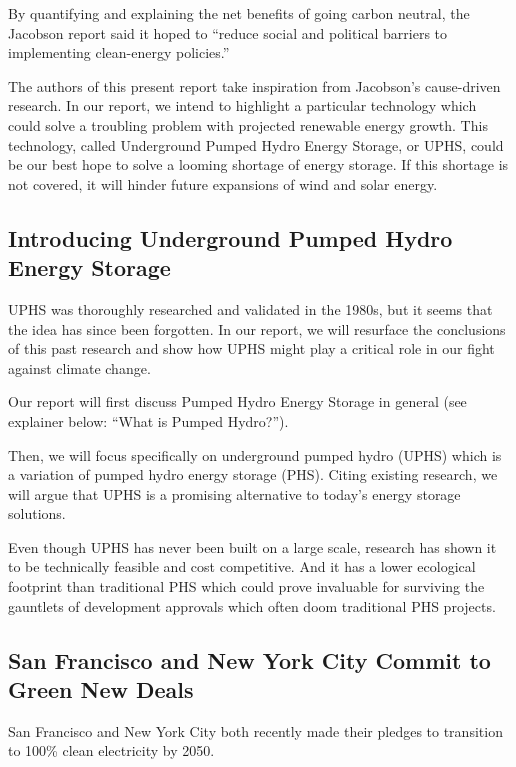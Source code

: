 \documentclass[hidelinks,12pt,a4paper]{article}
\begin{document}
By quantifying and explaining the net benefits of going carbon neutral, the Jacobson report said it hoped to “reduce social and political barriers to implementing clean-energy policies.” \cite{100PercCleanAndRenewableEnergyBy2050}

The authors of this present report take inspiration from Jacobson's cause-driven research. In our report, we intend to highlight a particular technology which could solve a troubling problem with projected renewable energy growth. This technology, called Underground Pumped Hydro Energy Storage, or UPHS, could be our best hope to solve a looming shortage of energy storage. If this shortage is not covered, it will hinder future expansions of wind and solar energy.

\subsection{Introducing Underground Pumped Hydro Energy Storage}
UPHS was thoroughly researched and validated in the 1980s, but it seems that the idea has since been forgotten. In our report, we will resurface the conclusions of this past research and show how UPHS might play a critical role in our fight against climate change.

Our report will first discuss Pumped Hydro Energy Storage in general (see explainer below: “What is Pumped Hydro?”).

Then, we will focus specifically on underground pumped hydro (UPHS) which is a variation of pumped hydro energy storage (PHS). Citing existing research, we will argue that UPHS is a promising alternative to today's energy storage solutions.

Even though UPHS has never been built on a large scale, research has shown it to be technically feasible and cost competitive. And it has a lower ecological footprint than traditional PHS which could prove invaluable for surviving the gauntlets of development approvals which often doom traditional PHS projects.

\subsection{San Francisco and New York City Commit to Green New Deals}
San Francisco and New York City both recently made their pledges to transition to 100\% clean electricity by 2050. \cite{SFNetZeroBy2050} \cite{ActionOnGlobalWarmingNYCsGreenNewDeal}
\end{document}
